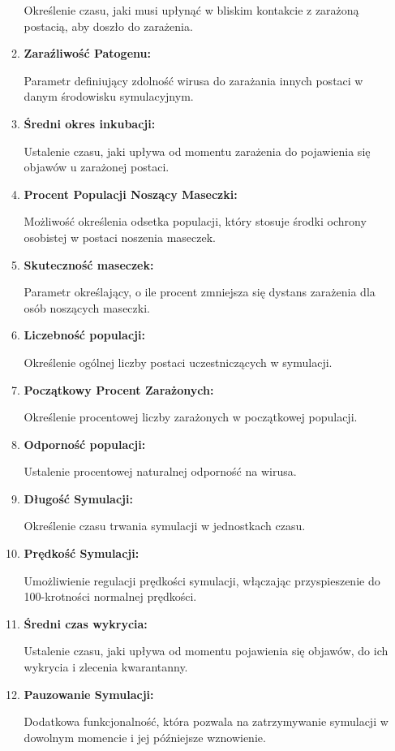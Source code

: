 \begin{itemize}
\begin{enumerate}
		Określenie czasu, jaki musi upłynąć w bliskim kontakcie z zarażoną postacią, aby doszło do zarażenia.
		\item \textbf{Zaraźliwość Patogenu:}
		
		Parametr definiujący zdolność wirusa do zarażania innych postaci w danym środowisku symulacyjnym.
		\item \textbf{Średni okres inkubacji:}
		
		Ustalenie czasu, jaki upływa od momentu zarażenia do pojawienia się objawów u zarażonej postaci.
		\item \textbf{Procent Populacji Noszący Maseczki:}
		
		Możliwość określenia odsetka populacji, który stosuje środki ochrony osobistej w postaci noszenia maseczek.
		\item \textbf{Skuteczność maseczek:}
		
		Parametr określający, o ile procent zmniejsza się dystans zarażenia dla osób noszących maseczki.
		\item \textbf{Liczebność populacji:}
		
		Określenie ogólnej liczby postaci uczestniczących w symulacji.
		
		\item \textbf{Początkowy Procent Zarażonych:}
		
		Określenie procentowej liczby zarażonych w początkowej populacji.
		\item \textbf{Odporność populacji:}
		
		Ustalenie procentowej naturalnej odporność na wirusa.
		\item \textbf{Długość Symulacji:}
		
		Określenie czasu trwania symulacji w jednostkach czasu.
		\item \textbf{Prędkość Symulacji:}
		
		Umożliwienie regulacji prędkości symulacji, włączając przyspieszenie do 100-krotności normalnej prędkości.
		
		\item \textbf{Średni czas wykrycia:}
		
		Ustalenie czasu, jaki upływa od momentu pojawienia się objawów, do ich wykrycia i zlecenia kwarantanny.
		\item \textbf{Pauzowanie Symulacji:}
		
		Dodatkowa funkcjonalność, która pozwala na zatrzymywanie symulacji w dowolnym momencie i jej późniejsze wznowienie.
	\end{enumerate}
\end{itemize}
